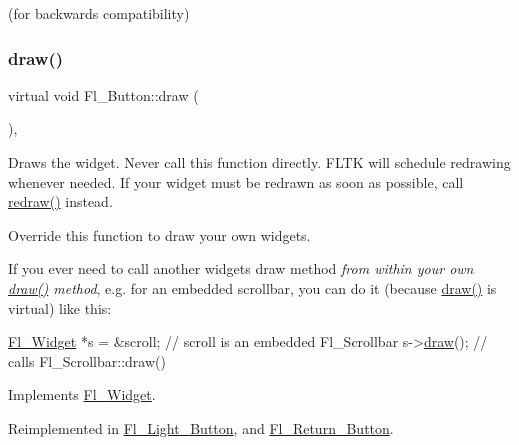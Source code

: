 (for backwards compatibility) 

\mbox{\label{class_fl___button_a98687e86bf07a47a8be8325250e2036b}} 
\subsubsection{\texorpdfstring{draw()}{draw()}}
{\footnotesize\ttfamily virtual void Fl\+\_\+\+Button\+::draw (\begin{DoxyParamCaption}{ }\end{DoxyParamCaption})\hspace{0.3cm}{\ttfamily [protected]}, {\ttfamily [virtual]}}

Draws the widget. Never call this function directly. F\+L\+TK will schedule redrawing whenever needed. If your widget must be redrawn as soon as possible, call \hyperlink{class_fl___widget_aa63ce68cbf4620cf8750b868368ea02b}{redraw()} instead.

Override this function to draw your own widgets.

If you ever need to call another widget\textquotesingle{}s draw method {\itshape from within your own \hyperlink{class_fl___button_a98687e86bf07a47a8be8325250e2036b}{draw()} method}, e.\+g. for an embedded scrollbar, you can do it (because \hyperlink{class_fl___button_a98687e86bf07a47a8be8325250e2036b}{draw()} is virtual) like this\+:


\begin{DoxyCode}
    \hyperlink{class_fl___widget}{Fl\_Widget} *s = &scroll;     \textcolor{comment}{// scroll is an embedded Fl\_Scrollbar}
s->\hyperlink{class_fl___widget_a1acb38c6b3cb40452ad02ccfeedbac8a}{draw}();          \textcolor{comment}{// calls Fl\_Scrollbar::draw()}
\end{DoxyCode}
 

Implements \hyperlink{class_fl___widget_a1acb38c6b3cb40452ad02ccfeedbac8a}{Fl\+\_\+\+Widget}.



Reimplemented in \hyperlink{class_fl___light___button_a3b27affd4a406d49cff709cbcc8c828e}{Fl\+\_\+\+Light\+\_\+\+Button}, and \hyperlink{class_fl___return___button_a38f67742bb98547f4f2d46457f2321c9}{Fl\+\_\+\+Return\+\_\+\+Button}.

\mbox{\label{class_fl___button_a85a9bcd4943f577e6eb68f054ae3c80c}} 

